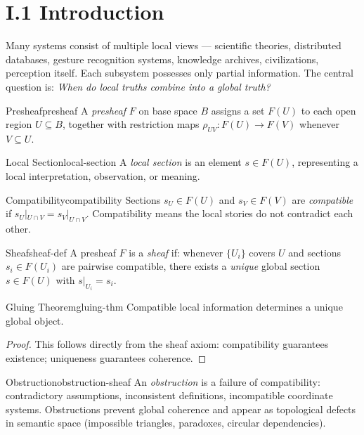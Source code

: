 
\section*{I.1 Introduction}

Many systems consist of multiple local views — scientific theories,
distributed databases, gesture recognition systems, knowledge archives,
civilizations, perception itself. Each subsystem possesses only partial
information. The central question is:
\emph{When do local truths combine into a global truth?}

\begin{definition}{Presheaf}{presheaf}
  A \emph{presheaf} $F$ on base space $B$ assigns a set $F(U)$ to each
  open region $U \subseteq B$, together with restriction maps
  $\rho_{UV} : F(U) \to F(V)$ whenever $V \subseteq U$.
\end{definition}

\begin{definition}{Local Section}{local-section}
  A \emph{local section} is an element $s \in F(U)$, representing a
  local interpretation, observation, or meaning.
\end{definition}

\begin{definition}{Compatibility}{compatibility}
  Sections $s_U \in F(U)$ and $s_V \in F(V)$ are \emph{compatible} if
  $s_U|_{U \cap V} = s_V|_{U \cap V}$.
  Compatibility means the local stories do not contradict each other.
\end{definition}

\begin{definition}{Sheaf}{sheaf-def}
  A presheaf $F$ is a \emph{sheaf} if: whenever $\{U_i\}$ covers $U$
  and sections $s_i \in F(U_i)$ are pairwise compatible, there exists a
  \emph{unique} global section $s \in F(U)$ with $s|_{U_i} = s_i$.
\end{definition}

\begin{theorem}{Gluing Theorem}{gluing-thm}
  Compatible local information determines a unique global object.
\end{theorem}
\begin{proof}
  This follows directly from the sheaf axiom: compatibility guarantees
  existence; uniqueness guarantees coherence.
\end{proof}

\begin{definition}{Obstruction}{obstruction-sheaf}
  An \emph{obstruction} is a failure of compatibility: contradictory
  assumptions, inconsistent definitions, incompatible coordinate systems.
  Obstructions prevent global coherence and appear as topological defects
  in semantic space (impossible triangles, paradoxes, circular dependencies).
\end{definition}

